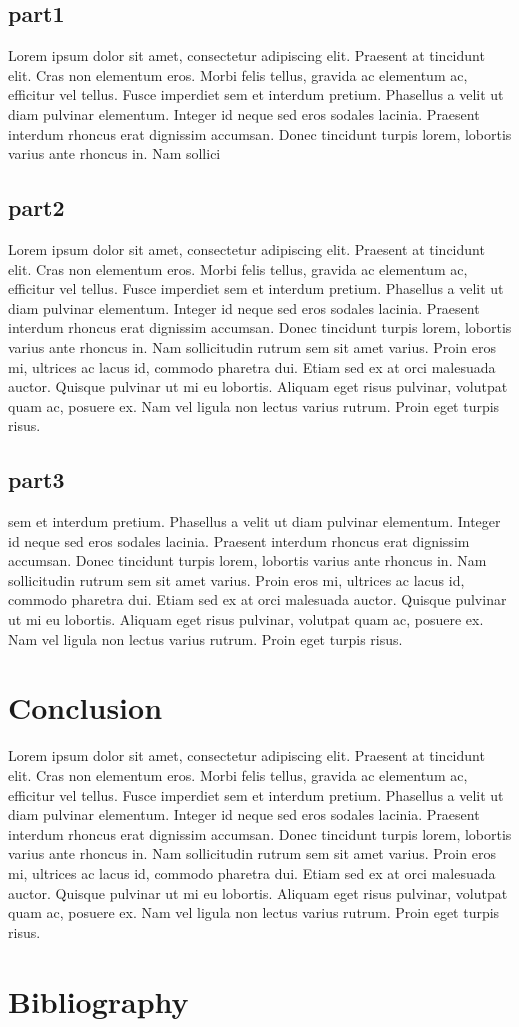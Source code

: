 \documentclass[12pt]{article}
\begin{document}
	\subsection{part1}
	Lorem ipsum dolor sit amet, consectetur adipiscing elit. Praesent at tincidunt elit. Cras non elementum eros. Morbi felis tellus, gravida ac elementum ac, efficitur vel tellus. Fusce imperdiet sem et interdum pretium. Phasellus a velit ut diam pulvinar elementum. Integer id neque sed eros sodales lacinia. Praesent interdum rhoncus erat dignissim accumsan. Donec tincidunt turpis lorem, lobortis varius ante rhoncus in. Nam sollici
	
	
	\subsection{part2}
	Lorem ipsum dolor sit amet, consectetur adipiscing elit. Praesent at tincidunt elit. Cras non elementum eros. Morbi felis tellus, gravida ac elementum ac, efficitur vel tellus. Fusce imperdiet sem et interdum pretium. Phasellus a velit ut diam pulvinar elementum. Integer id neque sed eros sodales lacinia. Praesent interdum rhoncus erat dignissim accumsan. Donec tincidunt turpis lorem, lobortis varius ante rhoncus in. Nam sollicitudin rutrum sem sit amet varius. Proin eros mi, ultrices ac lacus id, commodo pharetra dui. Etiam sed ex at orci malesuada auctor. Quisque pulvinar ut mi eu lobortis. Aliquam eget risus pulvinar, volutpat quam ac, posuere ex. Nam vel ligula non lectus varius rutrum. Proin eget turpis risus.
	
	
	\subsection{part3}
	sem et interdum pretium. Phasellus a velit ut diam pulvinar elementum. Integer id neque sed eros sodales lacinia. Praesent interdum rhoncus erat dignissim accumsan. Donec tincidunt turpis lorem, lobortis varius ante rhoncus in. Nam sollicitudin rutrum sem sit amet varius. Proin eros mi, ultrices ac lacus id, commodo pharetra dui. Etiam sed ex at orci malesuada auctor. Quisque pulvinar ut mi eu lobortis. Aliquam eget risus pulvinar, volutpat quam ac, posuere ex. Nam vel ligula non lectus varius rutrum. Proin eget turpis risus.
	
	
	\section{Conclusion}
	Lorem ipsum dolor sit amet, consectetur adipiscing elit. Praesent at tincidunt elit. Cras non elementum eros. Morbi felis tellus, gravida ac elementum ac, efficitur vel tellus. Fusce imperdiet sem et interdum pretium. Phasellus a velit ut diam pulvinar elementum. Integer id neque sed eros sodales lacinia. Praesent interdum rhoncus erat dignissim accumsan. Donec tincidunt turpis lorem, lobortis varius ante rhoncus in. Nam sollicitudin rutrum sem sit amet varius. Proin eros mi, ultrices ac lacus id, commodo pharetra dui. Etiam sed ex at orci malesuada auctor. Quisque pulvinar ut mi eu lobortis. Aliquam eget risus pulvinar, volutpat quam ac, posuere ex. Nam vel ligula non lectus varius rutrum. Proin eget turpis risus.
	
	\section{Bibliography}%
\end{document}
